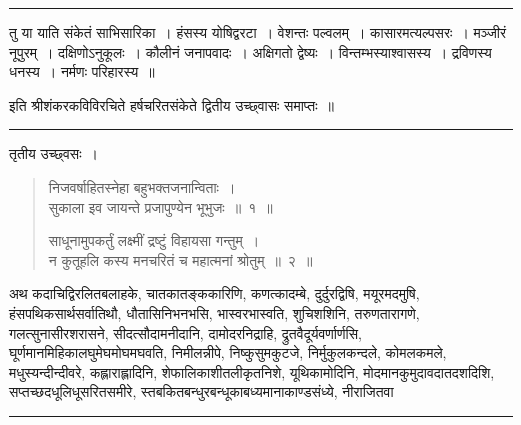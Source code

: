 \documentclass[11pt, openany]{book}
\begin{document}
\hrule

\noindent
{\s तु या याति संकेतं साभिसारिका~। {\qt हंसस्य योषिद्वरटा}~। वेशन्तः पल्वलम्~। कासारमत्यल्पसरः~। मञ्जीरं नूपुरम्~। दक्षिणोऽनुकूलः~। कौलीनं जनापवादः~। अक्षिगतो द्वेष्यः~। विन्तम्भस्याश्वासस्य~। द्रविणस्य धनस्य~। नर्मणः परिहारस्य~॥}

\begin{center}
{\s इति श्रीशंकरकविविरचिते हर्षचरितसंकेते द्वितीय उच्छ्वासः समाप्तः~॥}
\end{center}

\vspace*{\fill}

\begin{center}
\rule{0.2\linewidth}{0.5pt}
\end{center}

\vspace*{\fill}

\newpage
{}

\begin{center}
{\s तृतीय उच्छ्वसः~।}
\end{center}

\vspace{-5mm}
\begin{quote}
{\ha निजवर्षाहितस्नेहा बहुभक्तजनान्विताः~।\\
सुकाला इव जायन्ते प्रजापुण्येन भूभुजः~॥~१~॥

साधूनामुपकर्तुं लक्ष्मीं द्रष्टुं विहायसा गन्तुम्~।\\
न कुतूहलि कस्य मनचरितं च महात्मनां श्रोतुम्~॥~२~॥}
\end{quote}

\vspace{-5mm}
अथ कदाचिद्विरलितबलाहके, चातकातङ्ककारिणि, कणत्कादम्बे, दुर्दुरद्विषि, मयूरमदमुषि, हंसपथिकसार्थसर्वातिथौ, धौतासिनिभनभसि, भास्वरभास्वति, शुचिशशिनि, तरुणतारागणे, गलत्सुनासीरशरासने, सीदत्सौदामनीदानि, दामोदरनिद्राहि, द्रुतवैदूर्यवर्णार्णसि, घूर्णमानमिहिकालघुमेघमोघमघवति, निमीलन्नीपे, निष्कुसुमकुटजे, निर्मुकुलकन्दले, कोमलकमले, मधुस्यन्दीन्दीवरे, कह्लाराह्लादिनि, शेफालिकाशीतलीकृतनिशे, यूथिकामोदिनि, मोदमानकुमुदावदातदशदिशि, सप्तच्छदधूलिधूसरितसमीरे, स्तबकितबन्धुरबन्धूकाबध्यमानाकाण्डसंध्ये, नीराजितवा\textendash

\vspace{2mm}
\hrule
\end{document}
